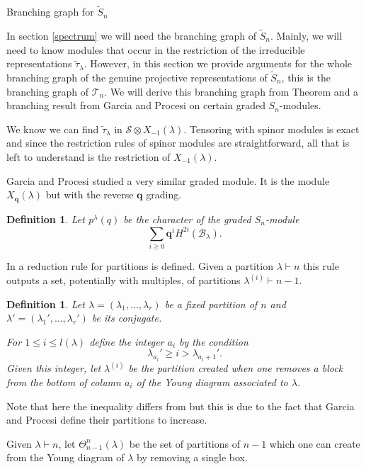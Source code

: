 \documentclass[a4paper,10pt]{amsart}
\newtheorem{definition}[theorem]{Definition}
\begin{document}
\begin{section}{Branching graph for $\tilde{S}_n$}\label{branching}


In section \ref{spectrum} we will need the branching graph of $\tilde{S}_n$. Mainly, we will need to know modules that occur in the restriction of the irreducible representations $\tilde{\tau}_\lambda$. However, in this section we provide arguments for the whole branching graph of the genuine projective representations of $\tilde{S}_n$, this is the branching graph of $\mathcal{T}_n$. We will derive this branching graph from Theorem \cite[A.4]{CH15} and a branching result from Garcia and Procesi \cite{GP92} on certain graded $S_n$-modules.

We know we can find $\tilde{\tau}_\lambda$ in $\mathcal{S} \otimes X_{-1}(\lambda)$. Tensoring with spinor modules is exact and since the restriction rules of spinor modules are straightforward, all that is left to understand is the restriction of $X_{-1}(\lambda)$. 



Garcia and Procesi \cite{GP92} studied a very similar graded module. It is the module $X_{\textbf{q}}(\lambda)$ but with the reverse $\textbf{q}$ grading. 
\begin{definition} \cite[I.7]{GP92} Let  $p^\lambda (q)$ be the character of the graded $S_n$-module 
$$\sum_{i\geq0} \textbf{q}^i H^{2i}(\mathcal{B}_\lambda ).$$
\end{definition} 

In \cite{GP92} a reduction rule for partitions is defined. Given a partition $\lambda \vdash n$ this rule outputs a set, potentially with multiples, of partitions $\lambda^{(i)} \vdash n-1$. 

\begin{definition} \cite[1.1]{GP92} Let $\lambda = (\lambda_1,\ldots ,\lambda_r)$ be a fixed partition of $n$ and $\lambda' = (\lambda_1',\ldots ,\lambda_r')$ be its conjugate. 

For $1 \leq i \leq l(\lambda)$ define the integer $a_i$ by the condition
$$\lambda_{a_i}' \geq i > \lambda_{a_i+1}'.$$
Given this integer, let $\lambda^{(i)}$ be the partition created when one removes a block from the bottom of column $a_i$ of the Young diagram associated to $\lambda$. \end{definition}
Note that here the inequality differs from \cite{GP92} but this is due to the fact that Garcia and Procesi define their partitions to increase.


Given $\lambda \vdash n$, let $\Theta^n_{n-1}(\lambda)$ be the set of partitions of $n-1$ which one can create from the Young diagram of $\lambda$ by removing a single box.


\end{section}
\end{document}
